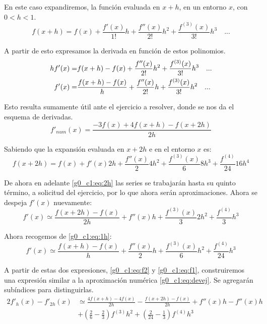 \documentclass[../portafolio.tex]{subfiles}
\begin{document}
En este caso expandiremos, la función evaluada en $x+h$, en un entorno $x$, con $0<h<1$.
\begin{equation}\label{g0_c1:eq:expansion2}
f(x+h)=f(x)+\frac{f'(x)}{1!}h+ \frac{f''(x)}{2!}h^2+\frac{f^{(3)}(x)}{3!}h^3 \quad ...
\end{equation}

A partir de esto expresamos la derivada en función de estos polinomios.
\begin{align}\notag
hf'(x)=&f(x+h)-f(x)+\frac{f''(x)}{2!}h^2+\frac{f^{(3)}(x)}{3!}h^3 \quad ...\\ 
f'(x)=&\frac{f(x+h)-f(x)}{h}+\frac{f''(x)}{2!}h+\frac{f^{(3)}(x)}{3!}h^2 \quad ...\label{g0_c1:eq:1h}
\end{align}

Esto resulta sumamente útil ante el ejercicio a resolver, donde se nos da el esquema de derivadas.
\begin{equation}\label{g0_c1:eq:devej}
f'_{num}(x)=\frac{-3f(x)+4f(x+h)-f(x+2h)}{2h}
\end{equation}

Sabiendo que la expansión evaluada en $x+2h$ e en el entorno $x$ es:
\begin{equation}\label{g0_c1:eq:2h}
f(x+2h)=f(x)+f'(x)2h+\frac{f''(x)}{2}4h^2+\frac{f^{(3)}(x)}{6}8h^3+\frac{f^{(4)}}{24}16h^4
\end{equation}

De ahora en adelante \eqref{g0_c1:eq:2h} las series se trabajarán hasta su quinto término, a solicitud del ejercicio, por lo que ahora serán aproximaciones. 
Ahora se despeja $f'(x)$ nuevamente:
\begin{equation}\label{g0_c1:eq:f2}
f'(x)\simeq \frac{f(x+2h)-f(x)}{2h}+f''(x)h+\frac{f^{(3)}(x)}{3}2h^2+\frac{f^{(4)}}{3}h^3
\end{equation}

Ahora recogemos de \eqref{g0_c1:eq:1h}:
\begin{equation}\label{g0_c1:eq:f1}
f'(x)\simeq \frac{f(x+h)-f(x)}{h}+\frac{f''(x)}{2}h+\frac{f^{(3)}(x)}{6}h^2+\frac{f^{(4)}}{24}h^3
\end{equation}

A partir de estas dos expresiones, \eqref{g0_c1:eq:f2} y \eqref{g0_c1:eq:f1}, construiremos una expresión similar a la aproximación numérica \eqref{g0_c1:eq:devej}. Se agregarán subíndices para distinguirlas.
\begin{align*}
2f'_h(x)-f'_{2h}(x)&\simeq \frac{4f(x+h)-4f(x)}{2h}-\frac{f(x+2h)-f(x)}{2h}+f''(x)h-f''(x)h\\
&+\left(\frac{2}{6}-\frac{2}{3}\right)f^{(3)}h^2+\left(\frac{2}{24}-\frac{1}{3}\right)f^{(4)}h^3
\end{align*}
\end{document}
